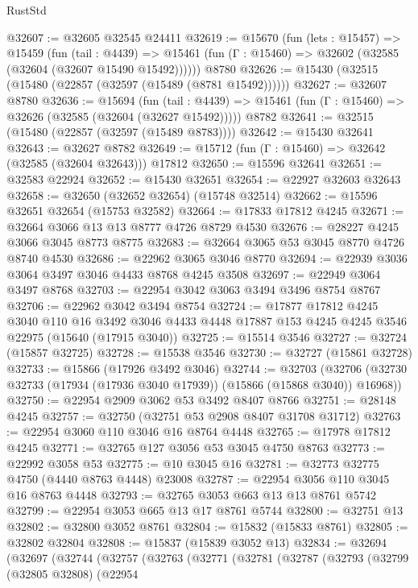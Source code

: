 \begin{lexlean}{RustStd}
\begin{coremodule}
{\begin{coremodule}
{{{{{{{{{{{{{{{{{{{{{{{{{{{{{{{{{{{{{{{{{{{{{{{{{{{{{{{{{{{{@32607 := @32605 @32545 @24411
@32619 := @15670
    (fun (lets : @15457) =>
    @15459
      (fun (tail : @4439) =>
      @15461 (fun (Γ : @15460) => @32602 (@32585 (@32604 (@32607 @15490 @15492))))))
    @8780
@32626 := @15430 (@32515 (@15480 (@22857 (@32597 (@15489 (@8781 @15492))))))
@32627 := @32607 @8780
@32636 := @15694
    (fun (tail : @4439) => @15461 (fun (Γ : @15460) => @32626 (@32585 (@32604 (@32627 @15492)))))
    @8782
@32641 := @32515 (@15480 (@22857 (@32597 (@15489 @8783))))
@32642 := @15430 @32641
@32643 := @32627 @8782
@32649 := @15712 (fun (Γ : @15460) => @32642 (@32585 (@32604 @32643))) @17812
@32650 := @15596 @32641
@32651 := @32583 @22924
@32652 := @15430 @32651
@32654 := @22927 @32603 @32643
@32658 := @32650 (@32652 @32654) (@15748 @32514)
@32662 := @15596 @32651 @32654 (@15753 @32582)
@32664 := @17833 @17812 @4245
@32671 := @32664 @3066 @13 @13 @8777 @4726 @8729 @4530
@32676 := @28227 @4245 @3066 @3045 @8773 @8775
@32683 := @32664 @3065 @53 @3045 @8770 @4726 @8740 @4530
@32686 := @22962 @3065 @3046 @8770
@32694 := @22939 @3036 @3064 @3497 @3046 @4433 @8768 @4245 @3508
@32697 := @22949 @3064 @3497 @8768
@32703 := @22954 @3042 @3063 @3494 @3496 @8754 @8767
@32706 := @22962 @3042 @3494 @8754
@32724 := @17877
    @17812
    @4245
    @3040
    @110
    @16
    @3492
    @3046
    @4433
    @4448
    @17887
    @153
    @4245
    @4245
    @3546
    @22975
    (@15640 (@17915 @3040))
@32725 := @15514 @3546
@32727 := @32724 (@15857 @32725)
@32728 := @15538 @3546
@32730 := @32727 (@15861 @32728)
@32733 := @15866 (@17926 @3492 @3046)
@32744 := @32703
    (@32706 (@32730 @32733 (@17934 (@17936 @3040 @17939)) (@15866 (@15868 @3040)) @16968))
@32750 := @22954 @2909 @3062 @53 @3492 @8407 @8766
@32751 := @28148 @4245
@32757 := @32750 (@32751 @53 @2908 @8407 @31708 @31712)
@32763 := @22954 @3060 @110 @3046 @16 @8764 @4448
@32765 := @17978 @17812 @4245
@32771 := @32765 @127 @3056 @53 @3045 @4750 @8763
@32773 := @22992 @3058 @53
@32775 := @10 @3045 @16
@32781 := @32773 @32775 @4750 (@4440 @8763 @4448) @23008
@32787 := @22954 @3056 @110 @3045 @16 @8763 @4448
@32793 := @32765 @3053 @663 @13 @13 @8761 @5742
@32799 := @22954 @3053 @665 @13 @17 @8761 @5744
@32800 := @32751 @13
@32802 := @32800 @3052 @8761
@32804 := @15832 (@15833 @8761)
@32805 := @32802 @32804
@32808 := @15837 (@15839 @3052 @13)
@32834 := @32694
    (@32697
      (@32744
        (@32757
          (@32763
            (@32771
              (@32781
                (@32787
                  (@32793
                    (@32799
                      (@32805 @32808)
                      (@22954
}}}}}}}}}}}}}}}}}}}}}}}}}}}}}}}}}}}}}}}}}}}}}}}}}}}}}}}}}}}}
\end{coremodule}}
\end{coremodule}
\end{lexlean}
